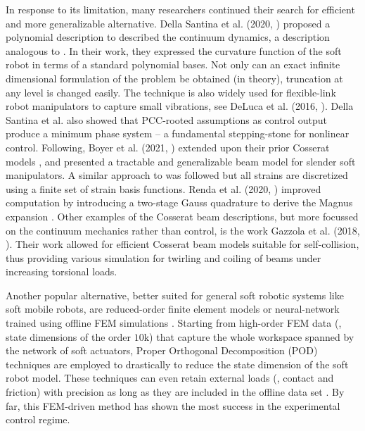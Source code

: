 In response to its limitation, many researchers continued their search for efficient and more generalizable alternative. Della Santina et al. (2020, \cite{DellaSantina2020}) proposed a polynomial description to described the continuum dynamics, a description analogous to \cite{Chirikjian1992}. In their work, they expressed the curvature function of the soft robot in terms of a standard polynomial bases. Not only can an exact infinite dimensional formulation of the problem be obtained (in theory), truncation at any level is changed easily. The technique is also widely used for flexible-link robot manipulators to capture small vibrations, see DeLuca et al. (2016, \cite{DeLuca2016Jul}). Della Santina et al. also showed that PCC-rooted assumptions as control output produce a minimum phase system \cite{DellaSantina2020} -- a fundamental stepping-stone for nonlinear control. Following, Boyer et al. (2021, \cite{Boyer2021}) extended upon their prior Cosserat models \cite{Renda2018,Renda2020}, and presented a tractable and generalizable beam model for slender soft manipulators. A similar approach to \cite{DellaSantina2020} was followed but all strains are discretized using a finite set of strain basis functions. Renda et al. (2020, \cite{Renda2020}) improved computation by introducing a two-stage Gauss quadrature \cite{Zanna1999} to derive the Magnus expansion \cite{Hairer2002}. Other examples of the Cosserat beam descriptions, but more focussed on the continuum mechanics rather than control, is the work Gazzola et al. (2018, \cite{Gazzola2018}). Their work allowed for efficient Cosserat beam models suitable for self-collision, thus providing various simulation for twirling and coiling of beams under increasing torsional loads.

Another popular alternative, better suited for general soft robotic systems like soft mobile robots, are reduced-order finite element models \cite{Duriez2013,Coevoet2017,Coevoet2017Feb,Goury2018,Thieffry2017,Thieffry2020,Tonkens2021May,Katzschmann2019Apr,Wu2021Feb,Zhang2017} or neural-network trained using offline FEM simulations \cite{Fang2020Dec}. Starting from high-order FEM data (\eg, state dimensions of the order $10$k) that capture the whole workspace spanned by the network of soft actuators, Proper Orthogonal Decomposition (POD) techniques are employed to drastically to reduce the state dimension of the soft robot model. These techniques can even retain external loads (\eg, contact and friction) with precision as long as they are included in the offline data set \cite{Goury2018}. By far, this FEM-driven method has shown the most success in the experimental control regime. 

